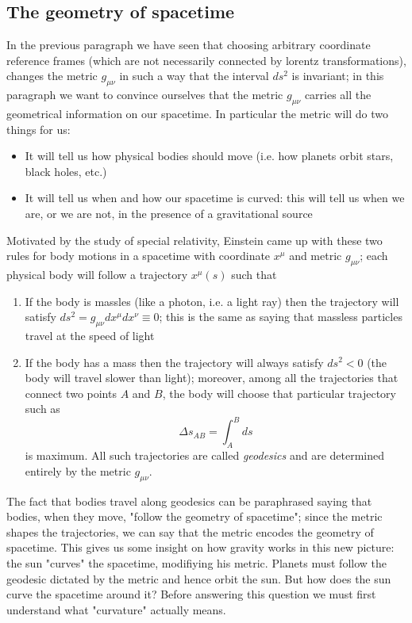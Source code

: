 \documentclass[11pt, a4paper,oneside,openright]{book}
\numberwithin{equation}{section}
\begin{document}
\subsection{The geometry of spacetime}
In the previous paragraph we have seen that choosing arbitrary coordinate reference frames (which are not necessarily connected by lorentz transformations), changes the metric $g_{\mu\nu}$ in such a way that the interval $ds^2$ is invariant; in this paragraph we want to convince ourselves that the metric $g_{\mu\nu}$ carries all the geometrical information on our spacetime. In particular the metric will do two things for us: 
\begin{itemize}
\item It will tell us how physical bodies should move (i.e. how planets orbit stars, black holes, etc.)
\item It will tell us when and how our spacetime is curved: this will tell us when we are, or we are not, in the presence of a gravitational source
\end{itemize}
Motivated by the study of special relativity, Einstein came up with these two rules for body motions in a spacetime with coordinate $x^{\mu}$ and metric $g_{\mu\nu}$; each physical body will follow a trajectory $x^{\mu}(s)$ such that 
\begin{enumerate}
\item If the body is massles (like a photon, i.e. a light ray) then the trajectory will satisfy $ds^2=g_{\mu\nu}dx^{\mu}dx^{\nu}\equiv 0$; this is the same as saying that massless particles travel at the speed of light
\item If the body has a mass then the trajectory will always satisfy $ds^2<0$ (the body will travel slower than light); moreover, among all the trajectories that connect two points $A$ and $B$, the body will choose that particular trajectory such as 
\begin{equation}
\Delta s_{AB}=\int_A^Bds
\end{equation}
is maximum. All such trajectories are called \textit{geodesics} and are determined entirely by the metric $g_{\mu\nu}$.
\end{enumerate}
The fact that bodies travel along geodesics can be paraphrased saying that bodies, when they move, "follow the geometry of spacetime"; since the metric shapes the trajectories, we can say that the metric encodes the geometry of spacetime. This gives us some insight on how gravity works in this new picture: the sun "curves" the spacetime, modifiying his metric. Planets must follow the geodesic dictated by the metric and hence orbit the sun. But how does the sun curve the spacetime around it? Before answering this question we must first understand what "curvature" actually means. 
\end{document}
